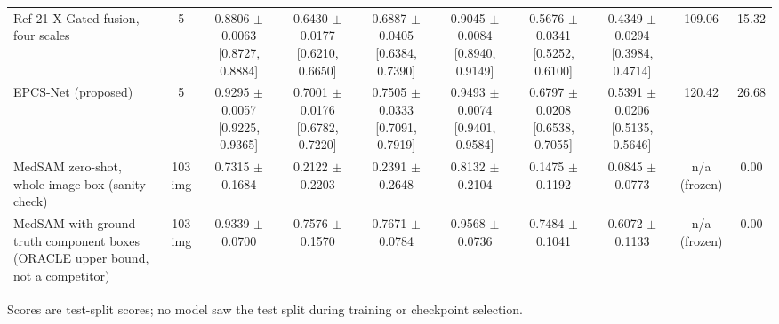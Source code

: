 \begin{table}[H]
{\begin{tabular}{lccccccccc}
Ref-21 X-Gated fusion, four scales & 5 & 0.8806 $\pm$ 0.0063 [0.8727, 0.8884] & 0.6430 $\pm$ 0.0177 [0.6210, 0.6650] & 0.6887 $\pm$ 0.0405 [0.6384, 0.7390] & 0.9045 $\pm$ 0.0084 [0.8940, 0.9149] & 0.5676 $\pm$ 0.0341 [0.5252, 0.6100] & 0.4349 $\pm$ 0.0294 [0.3984, 0.4714] & 109.06 & 15.32 \\
EPCS-Net (proposed) & 5 & 0.9295 $\pm$ 0.0057 [0.9225, 0.9365] & 0.7001 $\pm$ 0.0176 [0.6782, 0.7220] & 0.7505 $\pm$ 0.0333 [0.7091, 0.7919] & 0.9493 $\pm$ 0.0074 [0.9401, 0.9584] & 0.6797 $\pm$ 0.0208 [0.6538, 0.7055] & 0.5391 $\pm$ 0.0206 [0.5135, 0.5646] & 120.42 & 26.68 \\
\midrule
MedSAM zero-shot, whole-image box (sanity check) & 103 img & 0.7315 $\pm$ 0.1684 & 0.2122 $\pm$ 0.2203 & 0.2391 $\pm$ 0.2648 & 0.8132 $\pm$ 0.2104 & 0.1475 $\pm$ 0.1192 & 0.0845 $\pm$ 0.0773 & n/a (frozen) & 0.00 \\
MedSAM with ground-truth component boxes (ORACLE upper bound, not a competitor) & 103 img & 0.9339 $\pm$ 0.0700 & 0.7576 $\pm$ 0.1570 & 0.7671 $\pm$ 0.0784 & 0.9568 $\pm$ 0.0736 & 0.7484 $\pm$ 0.1041 & 0.6072 $\pm$ 0.1133 & n/a (frozen) & 0.00 \\
\bottomrule
\end{tabular}}
\par\vspace{2pt}\footnotesize{Scores are test-split scores; no model saw the test split during training or checkpoint selection.}
\end{table}